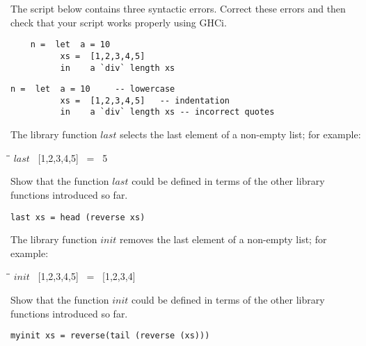 \documentclass{article}
\begin{document}
\begin{Exercise} 
   The script below contains three syntactic errors. Correct these errors and then check that your script works properly using GHCi. \\ 

\begin{lstlisting}
    n =  let  a = 10
          xs =  [1,2,3,4,5]
          in    a `div` length xs 
\end{lstlisting}
\end{Exercise} 
\begin{Answer}
\begin{lstlisting}
n =  let  a = 10     -- lowercase
          xs =  [1,2,3,4,5]   -- indentation
          in    a `div` length xs -- incorrect quotes
\end{lstlisting}
\end{Answer}
\begin{Exercise} 
The library function ${last}$ selects the last element of a non-empty list; for example:\\
\begin{tabbing}
	\=\hspace{2em}\=\kill
	\>\> $last$ \ [1,2,3,4,5] \ = \ 5 \\
\end{tabbing}
Show that the function $last$ could be defined in terms of the other library functions introduced so far. 
\end{Exercise} 
\begin{Answer}
\begin{lstlisting}
last xs = head (reverse xs)
\end{lstlisting}
\end{Answer}
\pagebreak
\begin{Exercise} 
The library function ${init}$ removes the last element of a non-empty list; for example:\\
\begin{tabbing}
	\=\hspace{2em}\=\kill
	\>\> $init$ \ [1,2,3,4,5] \ = \ [1,2,3,4] \\
\end{tabbing}
Show that the function $init$ could be defined in terms of the other library functions introduced so far. 
\end{Exercise} 
\begin{Answer}
\begin{lstlisting}
myinit xs = reverse(tail (reverse (xs)))
\end{lstlisting}
\end{Answer}
\end{document}
